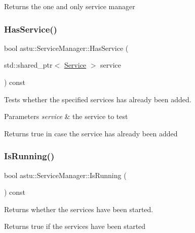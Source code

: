 \begin{DoxyReturn}{Returns}
the one and only service manager 
\end{DoxyReturn}
\mbox{\label{classastu_1_1ServiceManager_ab8af7a024cea64d9f4f4431360641b16}} 
\subsubsection{\texorpdfstring{Has\+Service()}{HasService()}}
{\footnotesize\ttfamily bool astu\+::\+Service\+Manager\+::\+Has\+Service (\begin{DoxyParamCaption}\item[{std\+::shared\+\_\+ptr$<$ \hyperlink{classastu_1_1Service}{Service} $>$}]{service }\end{DoxyParamCaption}) const}

Tests whether the specified services has already been added.


\begin{DoxyParams}{Parameters}
{\em service} & the service to test \\
\hline
\end{DoxyParams}
\begin{DoxyReturn}{Returns}
{\ttfamily true} in case the service has already been added 
\end{DoxyReturn}
\mbox{\label{classastu_1_1ServiceManager_a64cea7132b9be6521a9af6f76009e5d4}} 
\subsubsection{\texorpdfstring{Is\+Running()}{IsRunning()}}
{\footnotesize\ttfamily bool astu\+::\+Service\+Manager\+::\+Is\+Running (\begin{DoxyParamCaption}{ }\end{DoxyParamCaption}) const}

Returns whether the services have been started.

\begin{DoxyReturn}{Returns}
{\ttfamily true} if the services have been started 
\end{DoxyReturn}
\mbox{\label{classastu_1_1ServiceManager_ad94c3984be162a0d4e3633abd8b81099}} 
